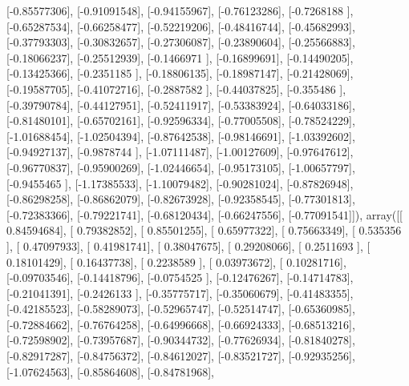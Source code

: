 \documentclass{article}
\begin{document}
       [-0.85577306],
       [-0.91091548],
       [-0.94155967],
       [-0.76123286],
       [-0.7268188 ],
       [-0.65287534],
       [-0.66258477],
       [-0.52219206],
       [-0.48416744],
       [-0.45682993],
       [-0.37793303],
       [-0.30832657],
       [-0.27306087],
       [-0.23890604],
       [-0.25566883],
       [-0.18066237],
       [-0.25512939],
       [-0.1466971 ],
       [-0.16899691],
       [-0.14490205],
       [-0.13425366],
       [-0.2351185 ],
       [-0.18806135],
       [-0.18987147],
       [-0.21428069],
       [-0.19587705],
       [-0.41072716],
       [-0.2887582 ],
       [-0.44037825],
       [-0.355486  ],
       [-0.39790784],
       [-0.44127951],
       [-0.52411917],
       [-0.53383924],
       [-0.64033186],
       [-0.81480101],
       [-0.65702161],
       [-0.92596334],
       [-0.77005508],
       [-0.78524229],
       [-1.01688454],
       [-1.02504394],
       [-0.87642538],
       [-0.98146691],
       [-1.03392602],
       [-0.94927137],
       [-0.9878744 ],
       [-1.07111487],
       [-1.00127609],
       [-0.97647612],
       [-0.96770837],
       [-0.95900269],
       [-1.02446654],
       [-0.95173105],
       [-1.00657797],
       [-0.9455465 ],
       [-1.17385533],
       [-1.10079482],
       [-0.90281024],
       [-0.87826948],
       [-0.86298258],
       [-0.86862079],
       [-0.82673928],
       [-0.92358545],
       [-0.77301813],
       [-0.72383366],
       [-0.79221741],
       [-0.68120434],
       [-0.66247556],
       [-0.77091541]]), array([[ 0.84594684],
       [ 0.79382852],
       [ 0.85501255],
       [ 0.65977322],
       [ 0.75663349],
       [ 0.535356  ],
       [ 0.47097933],
       [ 0.41981741],
       [ 0.38047675],
       [ 0.29208066],
       [ 0.2511693 ],
       [ 0.18101429],
       [ 0.16437738],
       [ 0.2238589 ],
       [ 0.03973672],
       [ 0.10281716],
       [-0.09703546],
       [-0.14418796],
       [-0.0754525 ],
       [-0.12476267],
       [-0.14714783],
       [-0.21041391],
       [-0.2426133 ],
       [-0.35775717],
       [-0.35060679],
       [-0.41483355],
       [-0.42185523],
       [-0.58289073],
       [-0.52965747],
       [-0.52514747],
       [-0.65360985],
       [-0.72884662],
       [-0.76764258],
       [-0.64996668],
       [-0.66924333],
       [-0.68513216],
       [-0.72598902],
       [-0.73957687],
       [-0.90344732],
       [-0.77626934],
       [-0.81840278],
       [-0.82917287],
       [-0.84756372],
       [-0.84612027],
       [-0.83521727],
       [-0.92935256],
       [-1.07624563],
       [-0.85864608],
       [-0.84781968],
\end{document}
